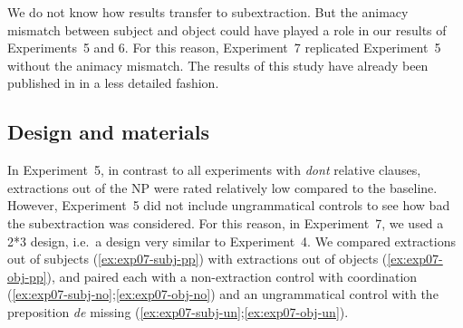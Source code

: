 We do not know how  results transfer to subextraction. But the animacy mismatch between subject and object could have played a role in our results of Experiments~5 and 6. For this reason, Experiment~7 replicated Experiment~5 without the animacy mismatch. The results of this study have already been published in \citet{Abeille.2020.JFLS} in a less detailed fashion. %

\subsection{Design and materials}
In Experiment~5, in contrast to all experiments with \emph{dont} relative clauses, extractions out of the NP were rated relatively low compared to the baseline. However, Experiment~5 did not include ungrammatical controls to see how bad the subextraction was considered. For this reason, in Experiment~7, we used a 2*3 design, i.e.\ a design very similar to Experiment~4. We compared extractions out of subjects (\ref{ex:exp07-subj-pp}) with extractions out of objects (\ref{ex:exp07-obj-pp}), and paired each with a non-extraction control with coordination (\ref{ex:exp07-subj-no};\ref{ex:exp07-obj-no}) and an ungrammatical control with the preposition \emph{de} missing (\ref{ex:exp07-subj-un};\ref{ex:exp07-obj-un}).


